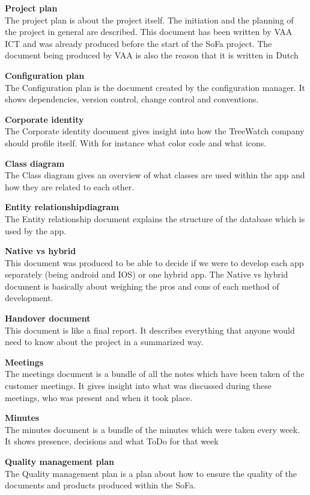 \documentclass[12pt]{report}
\begin{document}
  \textbf{Project plan}\\
  The project plan is about the project itself. The initiation and the planning of the project in general are described. This document has been written by VAA ICT and was already produced before the start of the SoFa project. The document being produced by VAA is also the reason that it is written in Dutch
    
  \textbf{Configuration plan}\\
  The Configuration plan is the document created by the configuration manager. It shows dependencies, version control, change control and conventions.
  
  \textbf{Corporate identity}\\
  The Corporate identity document gives insight into how the TreeWatch company should profile itself. With for instance what color code and what icons.
  
  \textbf{Class diagram}\\
  The Class diagram gives an overview of what classes are used within the app and how they are related to each other.
  
  \textbf{Entity relationshipdiagram}\\
  The Entity relationship document explains the structure of the database which is used by the app.
  
  \textbf{Native vs hybrid}\\
  This document was produced to be able to decide if we were to develop each app separately (being android and IOS) or one hybrid app. The Native vs hybrid document is basically about weighing the pros and cons of each method of development.
  
  \textbf{Handover document}\\
  This document is like a final report. It describes everything that anyone would need to know about the project in a summarized way.
  
  
  \textbf{Meetings}\\
  The meetings document is a bundle of all the notes which have been taken of the customer meetings. It gives insight into what was discussed during these meetings, who was present and when it took place.
  
  \textbf{Minutes}\\
  The minutes document is a bundle of the minutes which were taken every week. It shows presence, decisions and what ToDo for that week
  
  \textbf{Quality management plan}\\
  The Quality management plan is a plan about how to ensure the quality of the documents and products produced within the SoFa.
  
\end{document}
